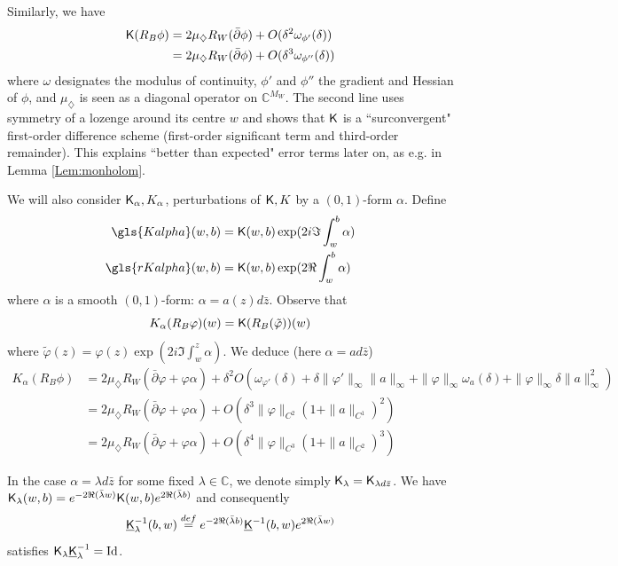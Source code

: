 \documentclass[10pt]{article}
\newcommand{\C}{\mathbb{C}}
\newcommand{\rK}{{\sf K}}
\newcommand{\uK}{{\underline {\sf K}}}
\newcommand{\dmd}{\diamondsuit}
\newcommand{\dbar}{\bar\partial}
\DeclareMathOperator{\Id}{Id}
\begin{document}
Similarly, we have
\begin{align}\label{eq:findiff}
\begin{split}
\rK(R_B\phi)&=2\mu_\dmd R_W(\dbar\phi)+O(\delta^2\omega_{\phi'}(\delta))\\
&=2\mu_\dmd R_W(\dbar\phi)+O(\delta^3\omega_{\phi''}(\delta))
\end{split}
\end{align}
where $\omega$ designates the modulus of continuity, $\phi'$ and $\phi''$ the gradient and Hessian of $\phi$, and $\mu_\dmd$ is seen as a diagonal operator on $\C^{M_W}$. The second line uses symmetry of a lozenge around its centre $w$ and shows that $\rK$ is a ``surconvergent" first-order difference scheme (first-order significant term and third-order remainder). This explains ``better than expected" error terms later on, as e.g. in Lemma \ref{Lem:monholom}.



We will also consider $\rK_\alpha,K_\alpha$, perturbations of $\rK,K$ by a $(0,1)$-form $\alpha$. Define
\begin{align}\label{eq:Kastpert}
%
\begin{split}
\gls{Kalpha}(w,b)&=\rK(w,b)\exp(2i\Im\int_w^b\alpha)\\
\gls{rKalpha}(w,b)&=\rK(w,b)\exp(2\Re\int_w^b\alpha)
%
\end{split}
\end{align}
where $\alpha$ is a smooth $(0,1)$-form: $\alpha=a(z)d\bar z$. 
%
%
%
%
%
%
%
Observe that
$$K_\alpha(R_B\varphi)(w)=\rK(R_B(\tilde\varphi))(w)$$
where $\tilde\varphi(z)=\varphi(z)\exp(2i\Im\int_w^z\alpha)$. We deduce (here $\alpha=ad\bar z$)
\begin{equation}\label{eq:findiffpert}
\begin{array}{rl}
K_\alpha(R_B\phi)&=2\mu_\dmd R_W(\dbar\varphi+\varphi\alpha)+\delta^2O(\omega_{\varphi'}(\delta)+\delta\|\varphi'\|_\infty\|a\|_{\infty}+\|\varphi\|_\infty\omega_a(\delta)+\|\varphi\|_\infty\delta\|a\|^2_\infty)\\
&=2\mu_\dmd R_W(\dbar\varphi+\varphi\alpha)+O(\delta^3\|\varphi\|_{C^2}(1+\|a\|_{C^1})^2)\\
&=2\mu_\dmd R_W(\dbar\varphi+\varphi\alpha)+O(\delta^4\|\varphi\|_{C^3}(1+\|a\|_{C^2})^3)
\end{array}
\end{equation}
%



In the case $\alpha=\lambda d\bar z$ for some fixed $\lambda\in\C$, we denote simply $\rK_\lambda=\rK_{\lambda d\bar z}$. We have $\rK_\lambda(w,b)=e^{-2\Re(\bar\lambda w)}\rK(w,b)e^{2\Re(\bar\lambda b)}$ and consequently
$$\uK_\lambda^{-1}(b,w)\stackrel{def}{=}e^{-2\Re(\bar\lambda b)}\uK^{-1}(b,w)e^{2\Re(\bar\lambda w)}$$
satisfies $\rK_\lambda\uK_\lambda^{-1}=\Id$.
\end{document}
